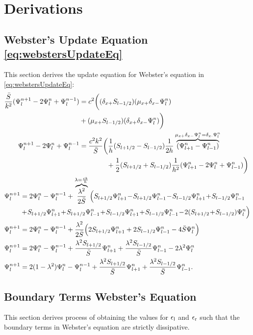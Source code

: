\chapter{Derivations}\label{app:derivations}
\def\Psilp{\Psi_{l+1}^n}
\def\Psilm{\Psi_{l-1}^n}
\def\Psinp{\Psi_l^{n+1}}
\def\Psinm{\Psi_l^{n-1}}

\section{Webster's Update Equation \eqref{eq:webstersUpdateEq}}\label{app:webstersUpdateEq}
This section derives the update equation for Webster's equation in \eqref{eq:webstersUpdateEq}:
\begin{align*}
    &\begin{aligned}
    \frac{\Sbar}{k^2}(\Psi_l^{n+1} - 2\Psiln+\Psi_l^{n-1}) &= c^2\bigg((\dxp \Sm)(\mxp \dxm \Psiln)\\
    & + (\mxp \Sm)(\dxp \dxm \Psiln)\bigg)\\
    \Psinp - 2\Psiln+\Psinm &= \frac{c^2k^2}{\Sbar}\bigg(\frac{1}{h}(\Sp - \Sm)\frac{1}{2h}\overbrace{(\Psilp -\Psilm)}^{\mxp\dxm\Psiln = \delta_{x\cdot}\Psiln}\nonumber\\
    &\qquad\qquad+\frac{1}{2}(\Sp + \Sm)\frac{1}{h^2}(\Psilp-2\Psiln+\Psilm)\bigg)
    \end{aligned}\\
    &\begin{aligned}
        \Psinp &= 2\Psiln-\Psinm + \overbrace{\frac{\lambda^2}{2\Sbar}}^{\lambda = \frac{ck}{h}}\Big(\Sp\Psilp\! -\! \Sp\Psilm\! -\! \Sm\Psilp\! +\! \Sm\Psilm \nonumber\\
        &+\! \Sp\Psilp\! +\! \Sp\Psilm\! +\! \Sm\Psilp\! +\! \Sm\Psilm \!-\! 2 (\Sp\! +\! \Sm)\Psiln\Big)\nonumber\\
        \Psinp &= 2\Psiln-\Psinm+ \frac{\lambda^2}{2\Sbar}\Big(2\Sp\Psilp + 2\Sm\Psilm - 4\Sbar\Psiln\Big)\nonumber\\
        \Psinp &= 2\Psiln-\Psinm+ \frac{\lambda^2\Sp}{\Sbar}\Psilp + \frac{\lambda^2\Sm}{\Sbar}\Psilm - 2\lambda^2\Psiln\nonumber\\
        \Psinp &= 2(1-\lambda^2)\Psiln-\Psinm+ \frac{\lambda^2\Sp}{\Sbar}\Psilp + \frac{\lambda^2\Sm}{\Sbar}\Psilm.
    \end{aligned}
\end{align*}

\section{Boundary Terms Webster's Equation}\label{app:boundaryWebster}
This section derives process of obtaining the values for $\epsilon_\text{l}$ and $\epsilon_\text{r}$ such that the boundary terms in Webster's equation are strictly dissipative. 

